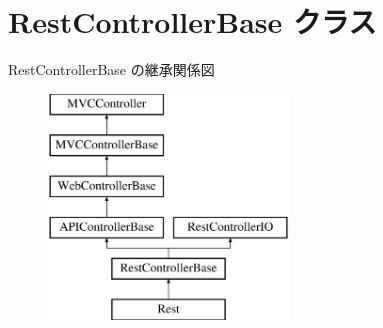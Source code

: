 \hypertarget{class_rest_controller_base}{}\section{Rest\+Controller\+Base クラス}
\label{class_rest_controller_base}
Rest\+Controller\+Base の継承関係図\begin{figure}[H]
\begin{center}
\leavevmode
\includegraphics[height=6.000000cm]{class_rest_controller_base}
\end{center}
\end{figure}
